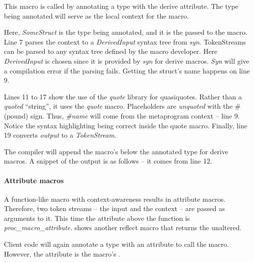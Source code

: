 This macro is called by annotating a type with the derive attribute.
The type being annotated will serve as the local context for the macro.


Here, \textit{SomeStruct} is the type being annotated, and it is the  passed to the macro.
Line 7 parses the context to a \textit{DerivedInput} syntax tree from \textit{syn}.
TokenStreams can be parsed to any syntax tree defined by the macro developer.
Here \textit{DerivedInput} is chosen since it is provided by \textit{syn} for derive macros.
\textit{Syn} will give a compilation error if the parsing fails.
Getting the struct's name happens on line 9.

Lines 11 to 17 show the use of the \textit{quote} library for quasiquotes.
Rather than a \textit{quoted} ``string'', it uses the \textit{quote} macro.
Placeholders are \textit{unquoted} with the \# (pound) sign.
Thus, \textit{\#name} will come from the metaprogram context -- line 9.
Notice the syntax highlighting being correct inside the quote macro.
Finally, line 19 converts \textit{output} to a \textit{TokenStream}.

The compiler will append the macro's  below the annotated type for derive macros.
A snippet of the output is as follows -- it comes from line 12.


\paragraph{Attribute macros}
\label{sec:attribute-macro}
A function-like macro with context-awareness results in attribute macros.
Therefore, two token streams -- the input and the context -- are passed as arguments to it.
This time the attribute above the function is \textit{proc\_macro\_attribute}.
 shows another reflect macro that returns the  unaltered.


Client code will again annotate a type with an attribute to call the macro.
However, the attribute is the macro's .

